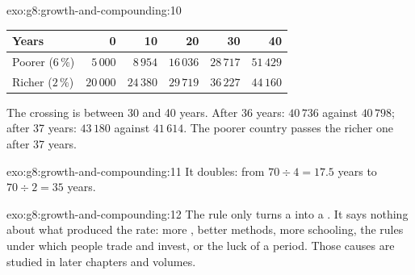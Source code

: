 \begin{solution}{exo:g8:growth-and-compounding:10}
\begin{center}
\begin{tabular}{lrrrrr}
\toprule
Years & 0 & 10 & 20 & 30 & 40 \\
\midrule
Poorer ($6\,\%$) & $5\,000$ & $8\,954$ & $16\,036$ & $28\,717$ & $51\,429$ \\
Richer ($2\,\%$) & $20\,000$ & $24\,380$ & $29\,719$ & $36\,227$ & $44\,160$ \\
\bottomrule
\end{tabular}
\end{center}
The crossing is between 30 and 40 years. After 36 years: $40\,736$ against $40\,798$; after 37 years:
$43\,180$ against $41\,614$. The poorer country passes the richer one after 37 years.
\end{solution}

\begin{solution}{exo:g8:growth-and-compounding:11}
It doubles: from $70 \div 4 = 17.5$ years to $70 \div 2 = 35$ years.
\end{solution}

\begin{solution}{exo:g8:growth-and-compounding:12}
The rule only turns a  into a . It says nothing about what produced the rate:
more , better methods, more schooling, the rules under which people trade and
invest, or the luck of a period. Those causes are studied in later chapters and volumes.
\end{solution}

